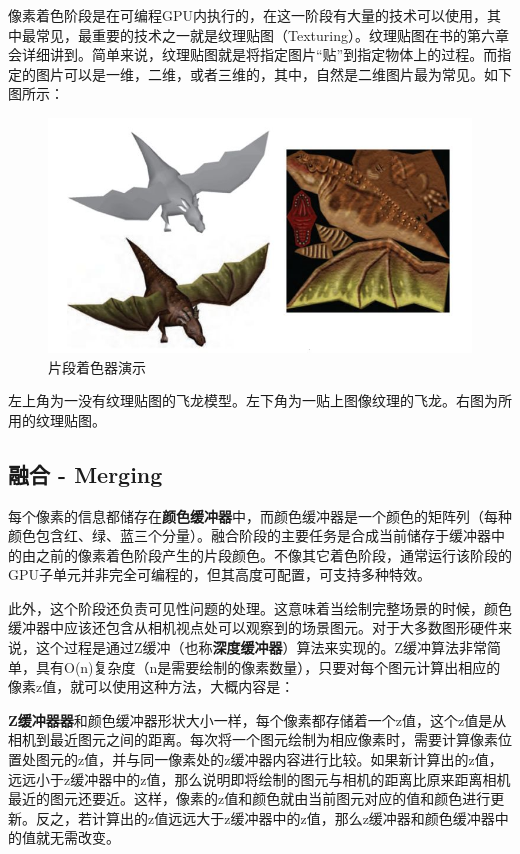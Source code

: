 \documentclass[UTF8,a4paper,12pt]{ctexbook}
\begin{document}
				像素着色阶段是在可编程GPU内执行的，在这一阶段有大量的技术可以使用，其中最常见，最重要的技术之一就是纹理贴图（Texturing）。纹理贴图在书的第六章会详细讲到。简单来说，纹理贴图就是将指定图片“贴”到指定物体上的过程。而指定的图片可以是一维，二维，或者三维的，其中，自然是二维图片最为常见。如下图所示：
					\begin{figure}[H]
						\centering
						\includegraphics[scale=0.57]{PixShader}
						\caption{片段着色器演示}
					\end{figure}
				
				左上角为一没有纹理贴图的飞龙模型。左下角为一贴上图像纹理的飞龙。右图为所用的纹理贴图。
				
			\subsection{融合 - Merging}
				每个像素的信息都储存在\textbf{颜色缓冲器}中，而颜色缓冲器是一个颜色的矩阵列（每种颜色包含红、绿、蓝三个分量）。融合阶段的主要任务是合成当前储存于缓冲器中的由之前的像素着色阶段产生的片段颜色。不像其它着色阶段，通常运行该阶段的GPU子单元并非完全可编程的，但其高度可配置，可支持多种特效。
				
				此外，这个阶段还负责可见性问题的处理。这意味着当绘制完整场景的时候，颜色缓冲器中应该还包含从相机视点处可以观察到的场景图元。对于大多数图形硬件来说，这个过程是通过Z缓冲（也称\textbf{深度缓冲器}）算法来实现的。Z缓冲算法非常简单，具有O(n)复杂度（n是需要绘制的像素数量），只要对每个图元计算出相应的像素z值，就可以使用这种方法，大概内容是：
				
				\textbf{Z缓冲器器}和颜色缓冲器形状大小一样，每个像素都存储着一个z值，这个z值是从相机到最近图元之间的距离。每次将一个图元绘制为相应像素时，需要计算像素位置处图元的z值，并与同一像素处的z缓冲器内容进行比较。如果新计算出的z值，远远小于z缓冲器中的z值，那么说明即将绘制的图元与相机的距离比原来距离相机最近的图元还要近。这样，像素的z值和颜色就由当前图元对应的值和颜色进行更新。反之，若计算出的z值远远大于z缓冲器中的z值，那么z缓冲器和颜色缓冲器中的值就无需改变。
														
\end{document}
